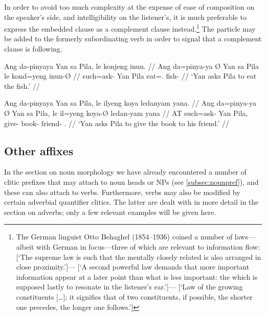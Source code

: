 In order to avoid too much complexity at the expense of ease of composition on 
the speaker's side, and intelligibility on the listener's, it is much 
preferable to express the embedded clause as a complement clause 
instead.\footnote{The German linguist Otto Behaghel (1854--1936) coined a 
number of laws---albeit with German in focus---three of which are relevant to 
information flow:  [`The 
supreme law is such that the mentally closely related is also arranged in close 
proximity.']--- [`A second powerful law demands that more 
important information appear at a later point than what is less important: the 
which is supposed lastly to resonate in the listener's 
ear.']--- [`Law of the growing constituents […]; it signifies that of 
two constituents, if possible, the shorter one precedes, the longer one 
follows.']} The particle  may be added to the formerly 
subordinating verb in order to signal that a complement clause is following.

\pex
\a\begingl
	\gla Ang da-pinyaya {} Yan sa Pila, \normalfont{[}le konjeng 
		inun\normalfont{]}. //
	\glb Ang da=pinya-ya Ø Yan sa Pila le kond=yeng inun-Ø //
	\glc \AgtT{} such=ask-\TsgM{} \Top{} Yan \Parg{} Pila \PatTI{} 
		eat=\TsgF{}.\Aarg{} fish-\Top{} //
	\glft `Yan asks Pila to eat the fish.' //
\endgl

\a\begingl
	\gla Ang da-pinyaya {} Yan sa Pila, \normalfont{[}le ilyeng koya 
		ledanyam yana\normalfont{]}. //
	\glb Ang da=pinya-ya Ø Yan sa Pila, le il=yeng koya-Ø ledan-yam
		yana //
	\glc AT such=ask-\TsgM{} \Top{} Yan \Parg{} Pila, \PatTI{} give-\TsgF{} 
		book-\Top{} friend-\Dat{} \TsgM{}.\Gen{} //
	\glft `Yan asks Pila to give the book to his friend.' //
\endgl
\xe


\subsection{Other affixes}

In the section on noun morphology we have already encountered a number of 
clitic prefixes that may attach to noun heads or NPs (see 
\autoref{subsec:nounpref}), and these can also attach to verbs. Furthermore, 
verbs may also be modified by certain adverbial quantifier clitics. The latter 
are dealt with in more detail in the section on adverbs; only a few relevant 
examples will be given here.


